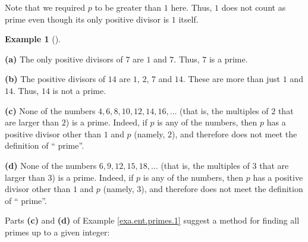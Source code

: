 \documentclass[numbers=enddot,12pt,final,onecolumn,notitlepage]{scrartcl}%
\numberwithin{exer}{subsection}
\theoremstyle{definition}
\newtheorem{exam}[theo]{Example}
\newenvironment{example}[1][]
{\begin{exam}[#1]\begin{leftbar}}
{\end{leftbar}\end{exam}}
\begin{document}
Note that we required $p$ to be greater than $1$ here. Thus, $1$ does not
count as prime even though its only positive divisor is $1$ itself.

\begin{example}
\label{exa.ent.primes.1}\textbf{(a)} The only positive divisors of $7$ are $1$
and $7$. Thus, $7$ is a prime.

\textbf{(b)} The positive divisors of $14$ are $1$, $2$, $7$ and $14$. These
are more than just $1$ and $14$. Thus, $14$ is not a prime.

\textbf{(c)} None of the numbers $4,6,8,10,12,14,16,\ldots$ (that is, the
multiples of $2$ that are larger than $2$) is a prime. Indeed, if $p$ is any
of the numbers, then $p$ has a positive divisor other than $1$ and $p$
(namely, $2$), and therefore does not meet the definition of \textquotedblleft
prime\textquotedblright.

\textbf{(d)} None of the numbers $6,9,12,15,18,\ldots$ (that is, the multiples
of $3$ that are larger than $3$) is a prime. Indeed, if $p$ is any of the
numbers, then $p$ has a positive divisor other than $1$ and $p$ (namely, $3$),
and therefore does not meet the definition of \textquotedblleft
prime\textquotedblright.
\end{example}

Parts \textbf{(c)} and \textbf{(d)} of Example \ref{exa.ent.primes.1} suggest
a method for finding all primes up to a given integer:
\end{document}
